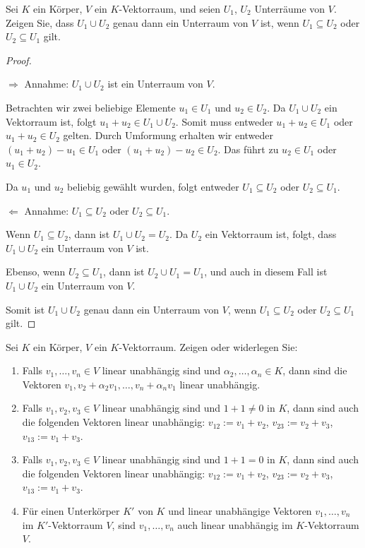 \documentclass{../problemset}
\author{Michael van Straten}
\begin{document}
\maketitle

\begin{problem}
Sei $K$ ein Körper, $V$ ein $K$-Vektorraum, und seien $U_1$, $U_2$ Unterräume von $V$. Zeigen Sie, dass $U_1 \cup U_2$ genau dann ein Unterraum von $V$ ist, wenn $U_1 \subseteq U_2$ oder $U_2 \subseteq U_1$ gilt.
\begin{proof}
	$ $

	$\Rightarrow$ Annahme: $U_1 \cup U_2$ ist ein Unterraum von $V$.

	Betrachten wir zwei beliebige Elemente $u_1 \in U_1$ und $u_2 \in U_2$.
	Da $U_1 \cup U_2$ ein Vektorraum ist, folgt $u_1 + u_2 \in U_1 \cup U_2$.
	Somit muss entweder $u_1 + u_2 \in U_1$ oder $u_1 + u_2 \in U_2$ gelten.
	Durch Umformung erhalten wir entweder $(u_1 + u_2) - u_1 \in U_1$ oder $(u_1 + u_2) - u_2 \in U_2$.
	Das führt zu $u_2 \in U_1$ oder $u_1 \in U_2$.

	Da $u_1$ und $u_2$ beliebig gewählt wurden, folgt entweder $U_1 \subseteq U_2$ oder $U_2 \subseteq U_1$. \checkmark

	$\Leftarrow$ Annahme: $U_1 \subseteq U_2$ oder $U_2 \subseteq U_1$.

	Wenn $U_1 \subseteq U_2$, dann ist $U_1 \cup U_2 = U_2$.
	Da $U_2$ ein Vektorraum ist, folgt, dass $U_1 \cup U_2$ ein Unterraum von $V$ ist.

	Ebenso, wenn $U_2 \subseteq U_1$, dann ist $U_2 \cup U_1 = U_1$, und auch in diesem Fall ist $U_1 \cup U_2$ ein Unterraum von $V$.  \checkmark

	Somit ist $U_1 \cup U_2$ genau dann ein Unterraum von $V$, wenn $U_1 \subseteq U_2$ oder $U_2 \subseteq U_1$ gilt.
\end{proof}
\end{problem}

\begin{problem}
Sei $K$ ein Körper, $V$ ein $K$-Vektorraum. Zeigen oder widerlegen Sie:
\begin{enumerate}
    \item Falls $v_1, \ldots, v_n \in V$ linear unabhängig sind und $\alpha_2, \ldots, \alpha_n \in K$, dann sind die Vektoren $v_1, v_2 + \alpha_2v_1, \ldots, v_n + \alpha_nv_1$ linear unabhängig.
    \item Falls $v_1, v_2, v_3 \in V$ linear unabhängig sind und $1 + 1 \neq 0$ in $K$, dann sind auch die folgenden Vektoren linear unabhängig: $v_{12} := v_1 + v_2$, $v_{23} := v_2 + v_3$, $v_{13} := v_1 + v_3$.
    \item Falls $v_1, v_2, v_3 \in V$ linear unabhängig sind und $1 + 1 = 0$ in $K$, dann sind auch die folgenden Vektoren linear unabhängig: $v_{12} := v_1 + v_2$, $v_{23} := v_2 + v_3$, $v_{13} := v_1 + v_3$.
    \item Für einen Unterkörper $K'$ von $K$ und linear unabhängige Vektoren $v_1, \ldots, v_n$ im $K'$-Vektorraum $V$, sind $v_1, \ldots, v_n$ auch linear unabhängig im $K$-Vektorraum $V$.
\end{enumerate}
\end{problem}
\end{document}
